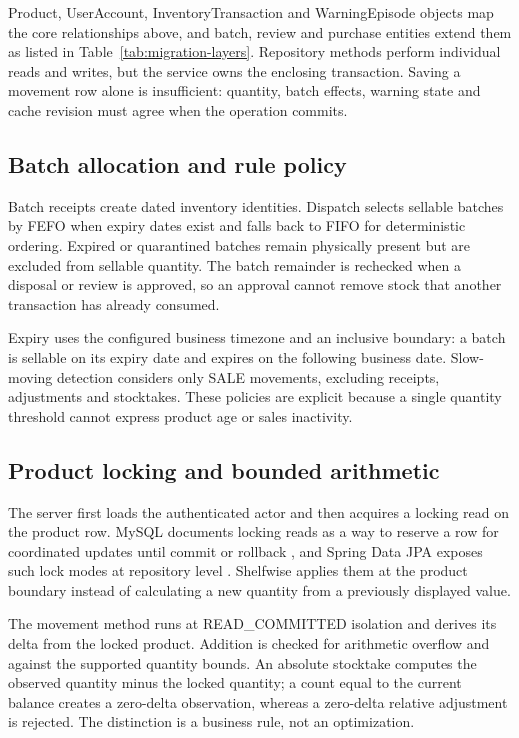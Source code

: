 Product, UserAccount, InventoryTransaction and WarningEpisode objects map the core relationships above, and batch, review and purchase entities extend them as listed in Table~\ref{tab:migration-layers}. Repository methods perform individual reads and writes, but the service owns the enclosing transaction. Saving a movement row alone is insufficient: quantity, batch effects, warning state and cache revision must agree when the operation commits.


\subsection{Batch allocation and rule policy}

Batch receipts create dated inventory identities. Dispatch selects sellable batches by FEFO when expiry dates exist and falls back to FIFO for deterministic ordering. Expired or quarantined batches remain physically present but are excluded from sellable quantity. The batch remainder is rechecked when a disposal or review is approved, so an approval cannot remove stock that another transaction has already consumed.


Expiry uses the configured business timezone and an inclusive boundary: a batch is sellable on its expiry date and expires on the following business date. Slow-moving detection considers only SALE movements, excluding receipts, adjustments and stocktakes. These policies are explicit because a single quantity threshold cannot express product age or sales inactivity.


\subsection{Product locking and bounded arithmetic}

The server first loads the authenticated actor and then acquires a locking read on the product row. MySQL documents locking reads as a way to reserve a row for coordinated updates until commit or rollback \citep{mysql-locks}, and Spring Data JPA exposes such lock modes at repository level \citep{spring-locks}. Shelfwise applies them at the product boundary instead of calculating a new quantity from a previously displayed value.


The movement method runs at READ\_COMMITTED isolation and derives its delta from the locked product. Addition is checked for arithmetic overflow and against the supported quantity bounds. An absolute stocktake computes the observed quantity minus the locked quantity; a count equal to the current balance creates a zero-delta observation, whereas a zero-delta relative adjustment is rejected. The distinction is a business rule, not an optimization.


